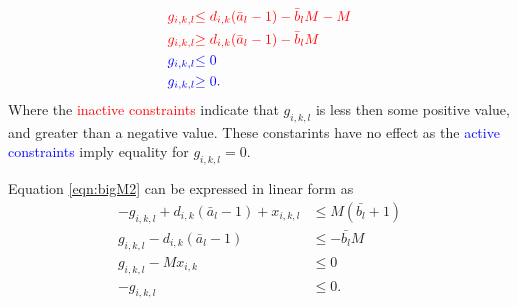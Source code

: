 \begin{equation}
	\begin{aligned}
		\color{red}{g_{i,k,l}}  &\color{red}{\le d_{i,k}(\bar{a}_l - 1) - \bar{b}_lM - M} \\
		\color{red}{g_{i,k,l}}  &\color{red}{\ge d_{i,k}(\bar{a}_l - 1) - \bar{b}_lM} \\
		\color{blue}{g_{i,k,l}} &\color{blue}{\le 0} \\
		\color{blue}{g_{i,k,l}} &\color{blue}{\ge 0}.  
	\end{aligned}
\end{equation}
Where the \textcolor{red}{inactive constraints} indicate that $g_{i,k,l}$ is less then some positive value, and greater than a negative value. These constarints have no effect as the \textcolor{blue}{active constraints} imply equality for $g_{i,k,l} = 0$.

\par Equation \ref{eqn:bigM2} can be expressed in linear form as 
\begin{equation}\label{eqn:chargeConstraints}
	\begin{aligned} 
		-g_{i,k,l} + d_{i,k}(\bar{a}_l - 1) + x_{i,k,l} &\le M(\bar{b_l} + 1) \\
		 g_{i,k,l} - d_{i,k}(\bar{a}_l - 1)  &\le  - \bar{b_l}M \\
		 g_{i,k,l} - Mx_{i,k} &\le 0 \\
		-g_{i,k,l} &\le 0.  
	\end{aligned}
\end{equation} 
